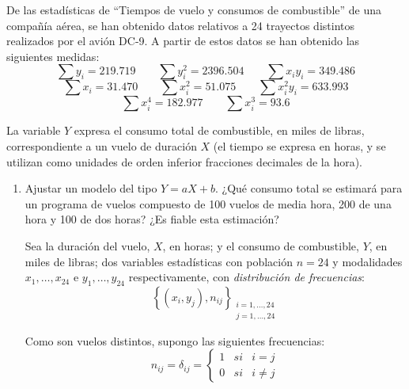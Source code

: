 \begin{ejercicio}
    De las estadísticas de ``Tiempos de vuelo y consumos de combustible'' de una compañía aérea, se han obtenido datos relativos a 24 trayectos distintos realizados por el avión DC-9. A partir de estos datos se han obtenido las siguientes medidas:
    $$\sum y_i = 219.719\qquad \sum y_i^2= 2396.504 \qquad \sum x_iy_i = 349.486$$
    $$\sum x_i = 31.470 \qquad \sum x_i^2 = 51.075 \qquad \sum x_i^2y_i = 633.993$$
    $$\sum x_i^4 = 182.977 \qquad \sum x_i^3 = 93.6$$

    La variable $Y$ expresa el consumo total de combustible, en miles de libras, correspondiente a un vuelo de duración $X$ (el tiempo se expresa en horas, y se utilizan como unidades de orden inferior fracciones decimales de la hora).
    \begin{enumerate}
        \item\label{Ej12:Ap.1} Ajustar un modelo del tipo $Y = aX+b$. ¿Qué consumo total se estimará para un programa de vuelos compuesto de 100 vuelos de media hora, 200 de una hora y 100 de dos horas? ¿Es fiable esta estimación?

        Sea la duración del vuelo, $X$, en horas; y el consumo de combustible, $Y$, en miles de libras; dos variables estadísticas con población $n=24$ y modalidades $x_1, \dots, x_{24}$ e $y_1, \dots, y_{24}$ respectivamente, con \emph{distribución de frecuencias}:
        $$\left\{ (x_i,y_j), n_{ij}\right\}_{\substack{i=1,\dots,24\\j=1,\dots,24}}$$

        Como son vuelos distintos, supongo las siguientes frecuencias:
        \begin{equation*}
            n_{ij} = \delta_{ij} = \left\{
            \begin{array}{ccc}
                1 & si & i=j \\
                0 & si & i\neq j
            \end{array}
            \right.
        \end{equation*}


\end{enumerate}
\end{ejercicio}
